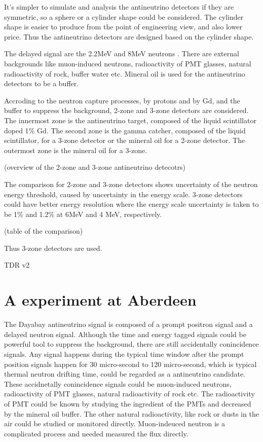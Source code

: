 It's simpler to simulate and analysis the antineutrino detectors if they are
symmetric, so a sphere or a cylinder shape could be considered. The cylinder
shape is easier to produce from the point of engineering view, and also lower
price. Thus the antineutrino detectors are designed based on the cylinder shape.

The delayed signal are the 2.2MeV and 8MeV neutrons . There are external backgrounds like
muon-induced neutrons, radioactivity of PMT glasses, natural radioactivity of rock,
buffer water etc. Mineral oil is used for the antineutrino detectors to be a buffer.

Accroding to the neutron capture processes, by protons and by Gd, and the buffer to
suppress the background, 2-zone and 3-zone detectors are considered. The innermost
zone is the antineutrino target, composed of the liquid scintillator doped 1\% Gd.
The second zone is the gamma catcher, composed of the liquid scintillator, for a
3-zone detector or the mineral oil for a 2-zone detector. The outermost zone
is the mineral oil for a 3-zone.

(overview of the 2-zone and 3-zone antineutrino detecotrs)


The comparison for 2-zone and 3-zone detectors shows 
uncertainty of the neutron energy threshold, caused by uncertainty in the energy scale.
3-zone detectors could have better energy resolution where the energy scale
uncertainty is taken to be 1\% and 1.2\% at 6MeV and 4 MeV, respectively.

(table of the comparison)

Thus 3-zone detectors are used.





TDR v2

\section{A experiment at Aberdeen}

The Dayabay antineutrino signal is composed of a prompt positron signal and a delayed
neutron signal. Although the time and energy tagged signals could be powerful tool to suppress
the background, there are still accidentally conincidence signals. Any signal happens during
the typical time window after the prompt position signals happen for 30 micro-second to 120 micro-second,
which is typical thermal neutron drifting time, 
could be regarded as a antineutrino candidate. These accidnetally conincidence signals could be
muon-induced neutrons, radioactivity of PMT glasses, natural radioactivity of rock etc.
The radioactivity of PMT could be known by studying the ingredient of the PMTs and decreased
by the mineral oil buffer. The other natural radioactivity, like rock or dusts in the 
air could be studied or monitored directly. Muon-indeuced neutron is a complicated
process and needed measured the flux directly.

